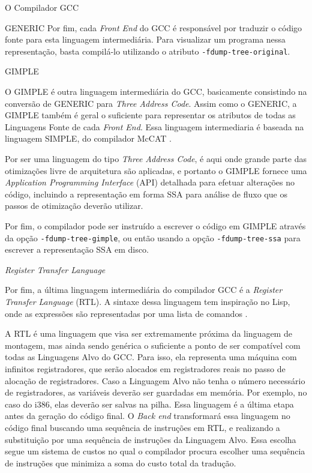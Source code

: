 \begin{section}{O Compilador GCC}
\begin{subsection}{GENERIC}
    Por fim, cada \textit{Front End} do GCC é responsável por traduzir o
código fonte para esta linguagem intermediária. Para visualizar um programa
nessa representação, basta compilá-lo utilizando o atributo
\texttt{-fdump-tree-original}.

\end{subsection}

\begin{subsection}{GIMPLE}

O GIMPLE é outra linguagem intermediária do GCC, basicamente consistindo na
conversão de GENERIC para \textit{Three Address Code}. Assim como o
GENERIC, a GIMPLE também é geral o suficiente para representar os atributos
de todas as Linguagens Fonte de cada \textit{Front End}.  Essa linguagem
intermediaria é baseada na linguagem SIMPLE, do compilador McCAT \citep{gimple}.

    Por ser uma linguagem do tipo \textit{Three Address Code}, é aqui onde
grande parte das otimizações livre de arquitetura são aplicadas, e portanto o
GIMPLE fornece uma \textit{Application Programming Interface} (API) detalhada
para efetuar alterações no código, incluindo a representação em forma SSA para análise
de fluxo que os passos de otimização deverão utilizar.

    Por fim, o compilador pode ser instruído a escrever o código em
GIMPLE através da opção \texttt{-fdump-tree-gimple}, ou então usando
a opção \texttt{-fdump-tree-ssa} para escrever a representação SSA
em disco.

\end{subsection}

\begin{subsection}{\textit{Register Transfer Language}}

    Por fim, a última linguagem intermediária do compilador GCC é a
\textit{Register Transfer Language} (RTL). A sintaxe dessa linguagem
tem inspiração no Lisp, onde as expressões são representadas por uma
lista de comandos \citep{rtl}.

    A RTL é uma linguagem que visa ser extremamente próxima da linguagem
de montagem, mas ainda sendo genérica o suficiente a ponto de ser compatível
com todas as Linguagens Alvo do GCC.
Para isso, ela representa uma máquina com infinitos
registradores, que serão alocados em registradores reais no passo de alocação de
registradores. Caso a Linguagem Alvo não tenha o número necessário de
registradores, as variáveis deverão ser guardadas em memória. Por exemplo,
no caso do i386, elas deverão ser salvas na pilha.
    Essa linguagem é a última etapa antes da geração do código final. O
\textit{Back end} transformará essa linguagem no código final buscando
uma sequência de instruções em RTL, e realizando a substituição por uma
sequência de instruções da Linguagem Alvo. Essa escolha segue um sistema
de custos no qual o compilador procura escolher uma sequência de instruções
que minimiza a soma do custo total da tradução.


\end{subsection}
\end{section}
